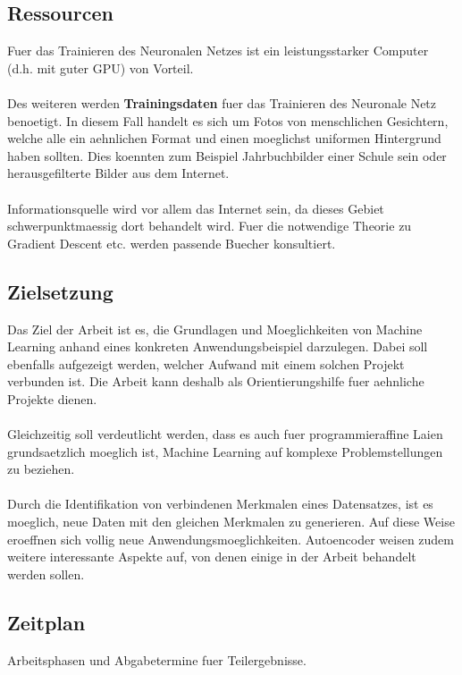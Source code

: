 \documentclass[12pt, a4paper]{article}
\begin{document}
\subsection*{Ressourcen}
Fuer das Trainieren des Neuronalen Netzes ist ein leistungsstarker Computer (d.h. mit guter GPU) von Vorteil.
\\\\
Des weiteren werden \textbf{Trainingsdaten} fuer das Trainieren des Neuronale Netz benoetigt. In diesem Fall handelt es sich um Fotos von menschlichen Gesichtern, welche alle ein aehnlichen Format und einen moeglichst uniformen Hintergrund haben sollten.
Dies koennten zum Beispiel Jahrbuchbilder einer Schule sein oder herausgefilterte Bilder aus dem Internet.
\\\\
Informationsquelle wird vor allem das Internet sein, da dieses Gebiet schwerpunktmaessig dort behandelt wird. Fuer die notwendige Theorie zu Gradient Descent etc. werden passende Buecher konsultiert.

\pagebreak

\subsection*{Zielsetzung}
Das Ziel der Arbeit ist es, die Grundlagen und Moeglichkeiten von Machine Learning anhand eines konkreten Anwendungsbeispiel darzulegen.
Dabei soll ebenfalls aufgezeigt werden, welcher Aufwand mit einem solchen Projekt verbunden ist.
Die Arbeit kann deshalb als Orientierungshilfe fuer aehnliche Projekte dienen.\\\\
Gleichzeitig soll verdeutlicht werden, dass es auch fuer programmieraffine Laien grundsaetzlich moeglich ist, Machine Learning auf komplexe Problemstellungen zu beziehen.
\\\\
Durch die Identifikation von verbindenen Merkmalen eines Datensatzes, ist es moeglich, neue Daten mit den gleichen Merkmalen zu generieren.
Auf diese Weise eroeffnen sich vollig neue Anwendungsmoeglichkeiten.
Autoencoder weisen zudem weitere interessante Aspekte auf, von denen einige in der Arbeit behandelt werden sollen.

\subsection*{Zeitplan}
Arbeitsphasen und Abgabetermine fuer Teilergebnisse.
\end{document}

